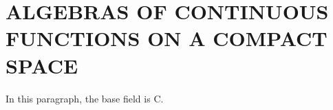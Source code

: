 \section{ALGEBRAS OF CONTINUOUS FUNCTIONS ON A COMPACT SPACE}

In this paragraph, the base field is C.

